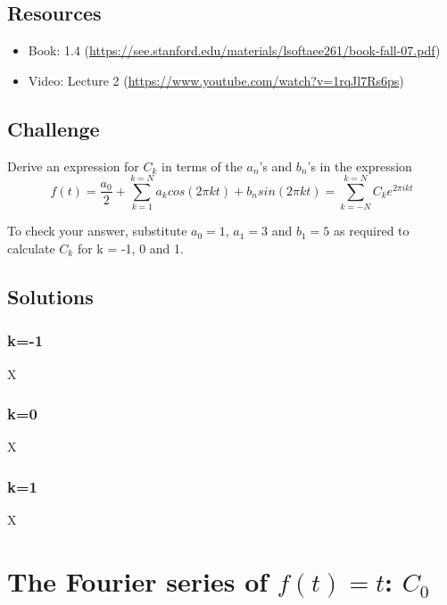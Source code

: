 \subsection*{Resources}
\begin{itemize}
    \item Book: 1.4 (\url{https://see.stanford.edu/materials/lsoftaee261/book-fall-07.pdf})
    \item Video: Lecture 2 (\url{https://www.youtube.com/watch?v=1rqJl7Rs6ps})
\end{itemize}

\subsection*{Challenge}
Derive an expression for $C_k$ in terms of the $a_n$'s and $b_n$'s in the expression
\begin{equation}
    f(t) = \frac{a_0}{2} + \sum_{k=1}^{k=N} a_k cos(2 \pi k t) + b_n sin(2 \pi k t) = \sum_{k=-N}^{k=N} C_k e^{2 \pi i k t}
\end{equation}

To check your answer, substitute $a_0 = 1$, $a_1 = 3$ and $b_1 = 5$ as required to calculate $C_k$ for k = -1, 0 and 1.

\subsection*{Solutions}
\subsubsection{k=-1}
X


\subsubsection{k=0}
X


\subsubsection{k=1}
X





\newpage

\section{The Fourier series of $f(t)=t$: $C_0$}

